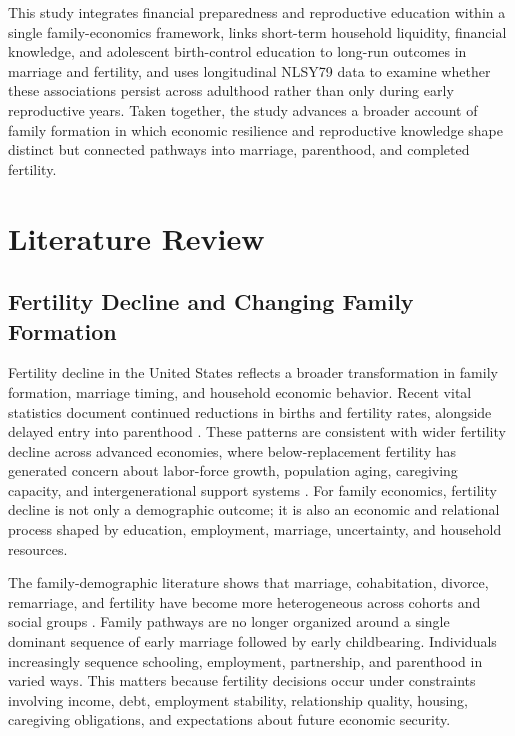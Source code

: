 \documentclass[12pt]{article}
\begin{document}
This study integrates financial preparedness and reproductive education within a single family-economics framework, links short-term household liquidity, financial knowledge, and adolescent birth-control education to long-run outcomes in marriage and fertility, and uses longitudinal NLSY79 data to examine whether these associations persist across adulthood rather than only during early reproductive years. Taken together, the study advances a broader account of family formation in which economic resilience and reproductive knowledge shape distinct but connected pathways into marriage, parenthood, and completed fertility.


\section{Literature Review}

\subsection{Fertility Decline and Changing Family Formation}

Fertility decline in the United States reflects a broader transformation in family formation, marriage timing, and household economic behavior. Recent vital statistics document continued reductions in births and fertility rates, alongside delayed entry into parenthood \citep{martin2025}. These patterns are consistent with wider fertility decline across advanced economies, where below-replacement fertility has generated concern about labor-force growth, population aging, caregiving capacity, and intergenerational support systems \citep{pew2025,doepke2022}. For family economics, fertility decline is not only a demographic outcome; it is also an economic and relational process shaped by education, employment, marriage, uncertainty, and household resources.

The family-demographic literature shows that marriage, cohabitation, divorce, remarriage, and fertility have become more heterogeneous across cohorts and social groups \citep{smock2020}. Family pathways are no longer organized around a single dominant sequence of early marriage followed by early childbearing. Individuals increasingly sequence schooling, employment, partnership, and parenthood in varied ways. This matters because fertility decisions occur under constraints involving income, debt, employment stability, relationship quality, housing, caregiving obligations, and expectations about future economic security.
\end{document}
